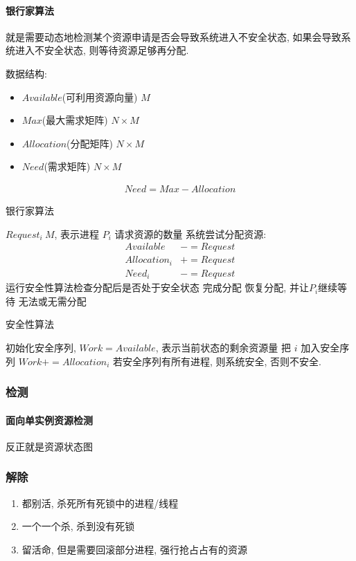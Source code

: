 \paragraph{银行家算法}就是需要动态地检测某个资源申请是否会导致系统进入不安全状态, 如果会导致系统进入不安全状态, 则等待资源足够再分配. 

数据结构:
\begin{itemize}
    \item $Available$(可利用资源向量) $M$
    \item $Max$(最大需求矩阵) $N\times M$
    \item $Allocation$(分配矩阵) $N\times M$
    \item $Need$(需求矩阵) $N\times M$
\end{itemize}
\begin{align*}
    Need = Max-Allocation
\end{align*}

\begin{algorithm}[H]
    \caption{银行家算法}
    \begin{algorithmic}
        \Require $Request_i\ M$, 表示进程 $P_i$ 请求资源的数量
            \State 系统尝试分配资源:
            \begin{align*}
                Available&-=Request\\
                Allocation_i&+=Request\\
                Need_i&-=Request
            \end{align*}
            \State 运行安全性算法检查分配后是否处于安全状态
                \State 完成分配
            \Else
                \State 恢复分配, 并让$P_i$继续等待
            \EndIf
        \Else
            \State 无法或无需分配
        \EndIf
    \end{algorithmic}
\end{algorithm}

\begin{algorithm}[H]
    \caption{安全性算法}
    \begin{algorithmic}
        \State 初始化安全序列, $Work=Available$, 表示当前状态的剩余资源量
            \State 把 $i$ 加入安全序列
            \State $Work+=Allocation_i$
        \EndWhile
        \State 若安全序列有所有进程, 则系统安全, 否则不安全. 
    \end{algorithmic}
\end{algorithm}

\subsubsection{检测}

\paragraph{面向单实例资源检测}反正就是资源状态图


\subsubsection{解除}
\begin{enumerate}
    \item 都别活, 杀死所有死锁中的进程/线程
    \item 一个一个杀, 杀到没有死锁
    \item 留活命, 但是需要回滚部分进程, 强行抢占占有的资源
\end{enumerate}